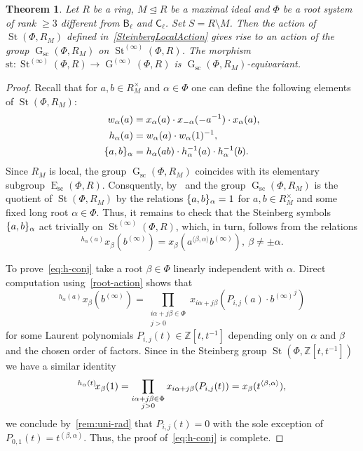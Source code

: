 \documentclass[oneside, 11pt]{amsart}
\numberwithin{equation}{section}
\newtheorem{theorem}{Theorem}
\theoremstyle{definition}
\theoremstyle{remark}
\DeclareMathOperator\St{St}
\DeclareMathOperator\GG{G}
\DeclareMathOperator\E{E}
\newcommand{\up}[2]{{^{#1}\!{#2}}}
\newcommand{\rB}{\mathsf{B}}
\newcommand{\rC}{\mathsf{C}}
\begin{document}
\begin{theorem}\label{ChevalleyLocalAction}
 Let \(R\) be a ring, \(M \trianglelefteq R\) be a maximal ideal and \(\Phi\) be a root system of rank \(\geq 3\) different from \(\rB_\ell\) and \(\rC_\ell\). Set \(S = R \setminus M\). Then the action of $\St(\Phi, R_M)$ defined in~\cref{SteinbergLocalAction} gives rise to an action of the group \(\GG_{\mathrm{sc}}(\Phi, R_M)\) on \(\St^{(\infty)}(\Phi, R)\). The morphism \(\mathrm{st} \colon \St^{(\infty)}(\Phi, R) \to \GG^{(\infty)}(\Phi, R)\) is \(\GG_{\mathrm{sc}}(\Phi, R_M)\)-equivariant.
\end{theorem}
\begin{proof}
 Recall that for \(a, b \in R_M^\times\) and \(\alpha \in \Phi\) one can define the following elements of $\St(\Phi, R_M)$: 
  \begin{align*} w_\alpha(a) & =  x_\alpha(a) \cdot x_{-\alpha}(-a^{-1}) \cdot x_\alpha(a), \\
                 h_\alpha(a) & =  w_\alpha(a) \cdot w_\alpha(1)^{-1}, \\
                 \{ a,\-b \}_\alpha & = h_\alpha(ab) \cdot h_\alpha^{-1}(a) \cdot h_\alpha^{-1}(b). \end{align*}
 Since $R_M$ is local, the group $\GG_{\mathrm{sc}}(\Phi, R_M)$ coincides with its elementary subgroup $\E_{\mathrm{sc}}(\Phi, R)$.
 Consquently, by~\cite[Proposition~1.6]{Abe69} and \cite[Theorem~2.13]{Ste73} the group \(\GG_{\mathrm{sc}}(\Phi, R_M)\) is the quotient of \(\St(\Phi, R_M)\) by the relations $\{a,\-b\}_\alpha = 1$ for \(a, b \in R_M^\times\) and some fixed long root $\alpha\in\Phi$. Thus, it remains to check that the Steinberg symbols $\{a,\-b\}_\alpha$ act trivially on \(\St^{(\infty)}(\Phi, R)\), which, in turn, follows from the relations
 \begin{equation}\label{eq:h-conj} \up{h_\alpha(a)}x_\beta(b^{(\infty)}) = x_\beta(a^{\langle \beta, \alpha \rangle}b^{(\infty)}),\ \beta\neq\pm\alpha. \end{equation}
 
To prove~\eqref{eq:h-conj} take a root \(\beta \in \Phi\) linearly independent with \(\alpha\).
 Direct computation using~\cref{root-action} shows that
 \[\up{h_\alpha(a)}{x_\beta(b^{(\infty)})} = \prod_{\substack{i\alpha + j\beta \in \Phi\\ j > 0}} x_{i\alpha + j\beta}(P_{i, j}(a) \cdot {b^{(\infty)}}^j)\]
 for some Laurent polynomials \(P_{i, j}(t) \in \mathbb Z[t, t^{-1}]\) depending only on \(\alpha\) and \(\beta\) and the chosen order of factors. Since in the Steinberg group \(\St(\Phi, \mathbb Z[t, t^{-1}])\) we have a similar identity
 \[\up{h_\alpha(t)}{x_\beta(1)} = \prod_{\substack{i\alpha + j\beta \in \Phi\\ j > 0}} x_{i\alpha + j\beta}(P_{i, j}(t)) = x_{\beta}(t^{\langle \beta,\-\alpha \rangle}),\]
 we conclude by~\cref{rem:uni-rad} that \(P_{i, j}(t) = 0\) with the sole exception of \(P_{0, 1}(t) = t^{(\beta, \alpha)}\). Thus, the proof of~\eqref{eq:h-conj} is complete.
\end{proof}
\end{document}

